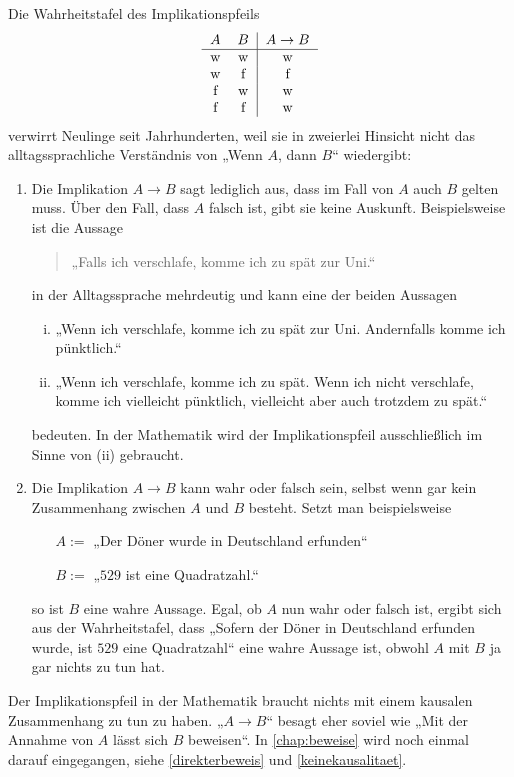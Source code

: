 \begin{bem}
    Die Wahrheitstafel des Implikationspfeils
    \[\begin{tabular}{cc|c}
        $A$ & $B$ &  $A\to B$  \\
        \hline
        w&w& w\\
        w&f& f\\
        f&w& w\\
        f&f& w\\
    \end{tabular}\]
    verwirrt Neulinge seit Jahrhunderten, weil sie in zweierlei Hinsicht nicht das alltagssprachliche Verständnis von „Wenn $A$, dann $B$“ wiedergibt:
    \begin{enumerate}[1.]
        \item Die Implikation $A\to B$ sagt lediglich aus, dass im Fall von $A$ auch $B$ gelten muss. Über den Fall, dass $A$ falsch ist, gibt sie keine Auskunft. Beispielsweise ist die Aussage
        \begin{quote}
            „Falls ich verschlafe, komme ich zu spät zur Uni.“
        \end{quote}
        in der Alltagssprache mehrdeutig und kann eine der beiden Aussagen
        \begin{enumerate}[(i)]
            \item „Wenn ich verschlafe, komme ich zu spät zur Uni. Andernfalls komme ich pünktlich.“
            \item „Wenn ich verschlafe, komme ich zu spät. Wenn ich nicht verschlafe, komme ich vielleicht pünktlich, vielleicht aber auch trotzdem zu spät.“
        \end{enumerate}
        bedeuten. In der Mathematik wird der Implikationspfeil ausschließlich im Sinne von (ii) gebraucht.
        \item Die Implikation $A\to B$ kann wahr oder falsch sein, selbst wenn gar kein Zusammenhang zwischen $A$ und $B$ besteht. Setzt man beispielsweise
        \begin{itemize}[labelindent=3em, leftmargin=!, labelwidth=]
            \item[$A:=$] „Der Döner wurde in Deutschland erfunden“
            \item[$B:=$] „$529$ ist eine Quadratzahl.“
        \end{itemize}
        so ist $B$ eine wahre Aussage. Egal, ob $A$ nun wahr oder falsch ist, ergibt sich aus der Wahrheitstafel, dass „Sofern der Döner in Deutschland erfunden wurde, ist $529$ eine Quadratzahl“ eine wahre Aussage ist, obwohl $A$ mit $B$ ja gar nichts zu tun hat.
    \end{enumerate}
    Der Implikationspfeil in der Mathematik braucht nichts mit einem kausalen Zusammenhang zu tun zu haben. „$A\to B$“ besagt eher soviel wie „Mit der Annahme von $A$ lässt sich $B$ beweisen“. In \cref{chap:beweise} wird noch einmal darauf eingegangen, siehe \cref{direkterbeweis} und \cref{keinekausalitaet}.
\end{bem}





